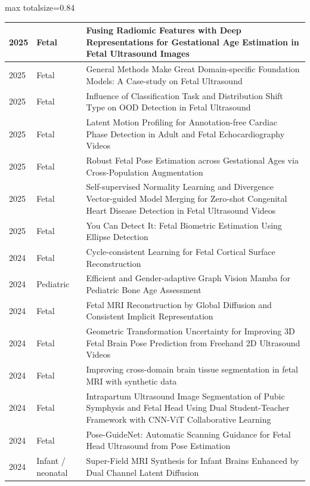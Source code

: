 \documentclass[aspectratio=169]{beamer}
\begin{document}
\begin{frame}
\begin{adjustbox}{max totalsize={\textwidth}{0.84\textheight}}
\begin{tabular}{|l|l|>{\raggedright\arraybackslash}p{}|}
2025 & Fetal & Fusing Radiomic Features with Deep Representations for Gestational Age Estimation in Fetal Ultrasound Images \\ \hline
2025 & Fetal & General Methods Make Great Domain-specific Foundation Models: A Case-study on Fetal Ultrasound \\ \hline
2025 & Fetal & Influence of Classification Task and Distribution Shift Type on OOD Detection in Fetal Ultrasound \\ \hline
2025 & Fetal & Latent Motion Profiling for Annotation-free Cardiac Phase Detection in Adult and Fetal Echocardiography Videos \\ \hline
2025 & Fetal & Robust Fetal Pose Estimation across Gestational Ages via Cross-Population Augmentation \\ \hline
2025 & Fetal & Self-supervised Normality Learning and Divergence Vector-guided Model Merging for Zero-shot Congenital Heart Disease Detection in Fetal Ultrasound Videos \\ \hline
2025 & Fetal & You Can Detect It: Fetal Biometric Estimation Using Ellipse Detection \\ \hline
2024 & Fetal & Cycle-consistent Learning for Fetal Cortical Surface Reconstruction \\ \hline
2024 & Pediatric & Efficient and Gender-adaptive Graph Vision Mamba for Pediatric Bone Age Assessment \\ \hline
2024 & Fetal & Fetal MRI Reconstruction by Global Diffusion and Consistent Implicit Representation \\ \hline
2024 & Fetal & Geometric Transformation Uncertainty for Improving 3D Fetal Brain Pose Prediction from Freehand 2D Ultrasound Videos \\ \hline
2024 & Fetal & Improving cross-domain brain tissue segmentation in fetal MRI with synthetic data \\ \hline
2024 & Fetal & Intrapartum Ultrasound Image Segmentation of Pubic Symphysis and Fetal Head Using Dual Student-Teacher Framework with CNN-ViT Collaborative Learning \\ \hline
2024 & Fetal & Pose-GuideNet: Automatic Scanning Guidance for Fetal Head Ultrasound from Pose Estimation \\ \hline
2024 & Infant / neonatal & Super-Field MRI Synthesis for Infant Brains Enhanced by Dual Channel Latent Diffusion \\ \hline
\end{tabular}
\end{adjustbox}
\\[2pt]
\end{frame}
\end{document}
